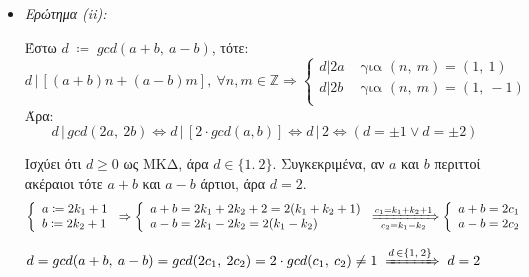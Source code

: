 \documentclass[12pt]{article}
\newcommand{\lt}{\latintext}
\newcommand{\ints}{\mathbb{Z}}
\begin{document}
\begin{itemize}
\item \textit{Ερώτημα ({\lt ii}):}

Έστω $d\;\coloneqq\; gcd(a+b,\:a-b)$, τότε:
\[
	d\, |\, [(a+b)n + (a-b)m],\: \forall n,m \in \ints \Rightarrow \left\{
	\begin{array}{ll}
		d | 2a & \text{ για } (n,\:m) = (1,\:1) \\
		d | 2b & \text{ για } (n,\:m) = (1,\:-1) \\ 
	\end{array}
	\right.
\]
Άρα:
\[
	d\,|\, gcd(2a,\:2b) \Leftrightarrow d\,|\,[2 \cdot gcd(a, b)] \Leftrightarrow d\,|\,2 \Leftrightarrow (d = \pm 1 \vee d = \pm 2)
\]

Ισχύει ότι $d \geq 0$ ως ΜΚΔ, άρα $d \in \{1.\:2\}$. Συγκεκριμένα, αν $a$ και $b$ περιττοί ακέραιοι τότε $a + b$ και $a - b$ άρτιοι, άρα $d = 2$.
\[
\left\{
\begin{array}{l}
	a \coloneqq 2k_1 + 1 \\
	b \coloneqq 2k_2 + 1 \\
\end{array}
\right. \Rightarrow 
\left\{
\begin{array}{l}
	a + b = 2k_1 + 2k_2 + 2 = 2(k_1 + k_2 + 1) \\
	a - b = 2k_1 - 2k_2 = 2(k_1 - k_2) \\
\end{array}
\right. \xRightarrow[c_2 = k_1 - k_2]{c_1 = k_1 + k_2 + 1}
\left\{
\begin{array}{l}
	a + b = 2c_1 \\
	a - b = 2c_2 \\
\end{array}
\right.
\]

$d = gcd(a + b,\:a - b) = gcd(2c_1,\:2c_2) = 2\cdot gcd(c_1,\:c_2) \neq 1\; \xRightarrow{d\, \in \{1,\:2\}} \; d = 2$
\end{itemize}

\pagebreak
\end{document}
